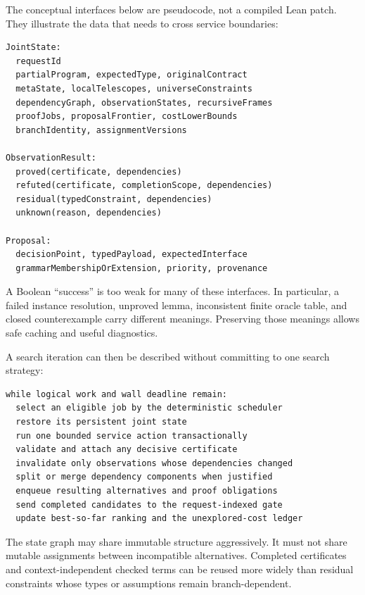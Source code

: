 \documentclass[11pt,a4paper]{article}
\theoremstyle{definition}
\theoremstyle{remark}
\begin{document}
The conceptual interfaces below are pseudocode, not a compiled Lean patch.
They illustrate the data that needs to cross service boundaries:
\par\noindent\begin{minipage}{\linewidth}
\begin{lstlisting}
JointState:
  requestId
  partialProgram, expectedType, originalContract
  metaState, localTelescopes, universeConstraints
  dependencyGraph, observationStates, recursiveFrames
  proofJobs, proposalFrontier, costLowerBounds
  branchIdentity, assignmentVersions

ObservationResult:
  proved(certificate, dependencies)
  refuted(certificate, completionScope, dependencies)
  residual(typedConstraint, dependencies)
  unknown(reason, dependencies)

Proposal:
  decisionPoint, typedPayload, expectedInterface
  grammarMembershipOrExtension, priority, provenance
\end{lstlisting}
\end{minipage}\par
A Boolean ``success'' is too weak for many of these interfaces. In particular,
a failed instance resolution, unproved lemma, inconsistent finite oracle table,
and closed counterexample carry different meanings. Preserving those meanings
allows safe caching and useful diagnostics.

A search iteration can then be described without committing to one search
strategy:
\par\noindent\begin{minipage}{\linewidth}
\begin{lstlisting}
while logical work and wall deadline remain:
  select an eligible job by the deterministic scheduler
  restore its persistent joint state
  run one bounded service action transactionally
  validate and attach any decisive certificate
  invalidate only observations whose dependencies changed
  split or merge dependency components when justified
  enqueue resulting alternatives and proof obligations
  send completed candidates to the request-indexed gate
  update best-so-far ranking and the unexplored-cost ledger
\end{lstlisting}
\end{minipage}\par
The state graph may share immutable structure aggressively. It must not share
mutable assignments between incompatible alternatives. Completed certificates
and context-independent checked terms can be reused more widely than residual
constraints whose types or assumptions remain branch-dependent.
\end{document}
